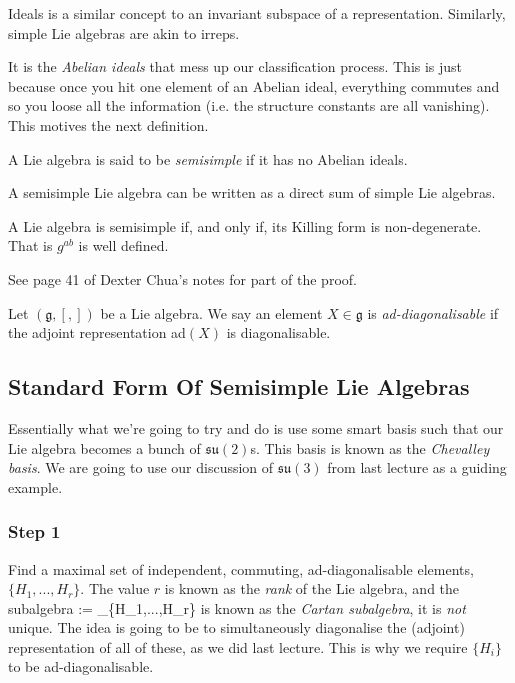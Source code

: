 \br 
    Ideals is a similar concept to an invariant subspace of a representation. Similarly, simple Lie algebras are akin to irreps. 
\er 

It is the \textit{Abelian ideals} that mess up our classification process. This is just because once you hit one element of an Abelian ideal, everything commutes and so you loose all the information (i.e. the structure constants are all vanishing). This motives the next definition. 

    A Lie algebra is said to be \textit{semisimple} if it has no Abelian ideals.
\ed 

\bt 
    A semisimple Lie algebra can be written as a direct sum of simple Lie algebras. 
\et 

\bt[Cartan]
    A Lie algebra is semisimple if, and only if, its Killing form is non-degenerate. That is $g^{ab}$ is well defined. 
\et 

\bq 
    See page 41 of Dexter Chua's notes for part of the proof.
\eq 

\bd[Ad-Diagonalisable]
    Let $(\mathfrak{g},[,])$ be a Lie algebra. We say an element $X\in\mathfrak{g}$ is \textit{ad-diagonalisable} if the adjoint representation ad$(X)$ is diagonalisable.
\ed 

\subsection{Standard Form Of Semisimple Lie Algebras}

Essentially what we're going to try and do is use some smart basis such that our Lie algebra becomes a bunch of $\mathfrak{su}(2)$s. This basis is known as the \textit{Chevalley basis}. We are going to use our discussion of $\mathfrak{su}(3)$ from last lecture as a guiding example. 

\subsubsection{Step 1}
Find a maximal set of independent, commuting, ad-diagonalisable elements, $\{H_1,...,H_r\}$. The value $r$ is known as the \textit{rank} of the Lie algebra, and the subalgebra 
\be 
\label{eqn:CartanSubalgebra}
     := _{\C}\{H_1,...,H_r\}
\ee 
is known as the \textit{Cartan subalgebra}, it is \textit{not} unique. The idea is going to be to simultaneously diagonalise the (adjoint) representation of all of these, as we did last lecture. This is why we require $\{H_i\}$ to be ad-diagonalisable.

